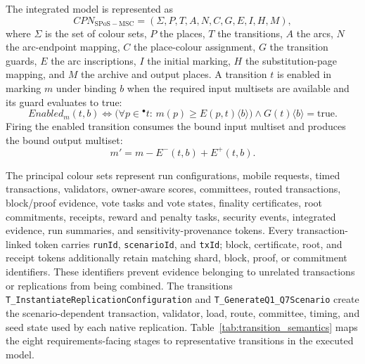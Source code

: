 \documentclass[a4paper,fleqn]{cas-sc}
\begin{document}
The integrated model is represented as
\begin{equation}
CPN_{\mathrm{SPoS-MSC}}=(\Sigma,P,T,A,N,C,G,E,I,H,M),
\label{eq:cpn_tuple}
\end{equation}
where \(\Sigma\) is the set of colour sets, \(P\) the places, \(T\) the
transitions, \(A\) the arcs, \(N\) the arc-endpoint mapping, \(C\) the
place-colour assignment, \(G\) the transition guards, \(E\) the arc
inscriptions, \(I\) the initial marking, \(H\) the substitution-page mapping,
and \(M\) the archive and output places. A transition \(t\) is enabled in
marking \(m\) under binding \(b\) when the required input multisets are
available and its guard evaluates to true:
\begin{equation}
Enabled_m(t,b)\Leftrightarrow
\bigl(\forall p\in{}^{\bullet}t:\,m(p)\geq E(p,t)\langle b\rangle\bigr)
\wedge G(t)\langle b\rangle=\mathrm{true}.
\label{eq:cpn_enabled}
\end{equation}
Firing the enabled transition consumes the bound input multiset and produces the
bound output multiset:
\begin{equation}
m'=m-E^{-}(t,b)+E^{+}(t,b).
\label{eq:cpn_firing}
\end{equation}

The principal colour sets represent run configurations, mobile requests, timed
transactions, validators, owner-aware scores, committees, routed transactions,
block/proof evidence, vote tasks and vote states, finality certificates, root
commitments, receipts, reward and penalty tasks, security events, integrated
evidence, run summaries, and sensitivity-provenance tokens. Every transaction-linked token carries
\texttt{runId}, \texttt{scenarioId}, and \texttt{txId}; block, certificate,
root, and receipt tokens additionally retain matching shard, block, proof, or
commitment identifiers. These identifiers prevent evidence belonging to
unrelated transactions or replications from being combined. The transitions
\texttt{T\_InstantiateReplicationConfiguration} and
\texttt{T\_GenerateQ1\_Q7Scenario} create the scenario-dependent transaction,
validator, load, route, committee, timing, and seed state used by each native replication. Table~\ref{tab:transition_semantics} maps the eight requirements-facing stages to representative transitions in the executed model.
\end{document}
